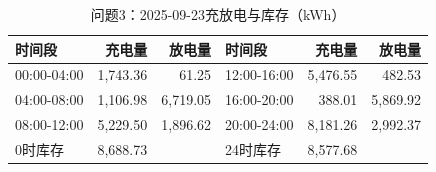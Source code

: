 \begin{table}[H]\centering\small\caption{问题3：2025-09-23充放电与库存（kWh）}\label{tab:q320250923b}
\begin{tabular}{lrrlrr}\toprule
时间段 & 充电量 & 放电量 & 时间段 & 充电量 & 放电量\\\midrule
00:00-04:00 & 1,743.36 & 61.25 & 12:00-16:00 & 5,476.55 & 482.53\\
04:00-08:00 & 1,106.98 & 6,719.05 & 16:00-20:00 & 388.01 & 5,869.92\\
08:00-12:00 & 5,229.50 & 1,896.62 & 20:00-24:00 & 8,181.26 & 2,992.37\\
0时库存 & 8,688.73 &  & 24时库存 & 8,577.68 & \\
\bottomrule\end{tabular}\end{table}
